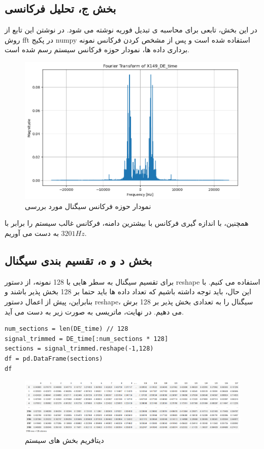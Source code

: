 \subsection{بخش ج، تحلیل فرکانسی}
در این بخش، تابعی برای محاسبه ی تبدیل فوریه نوشته می شود. در نوشتن این تابع از روش fft در پکیج numpy استفاده شده است و پس از مشخص کردن فرکانس نمونه برداری داده ها، نمودار حوزه فرکانس سیستم رسم شده است.


\begin{figure}
	\centering
	\includegraphics[width=1\linewidth]{../img/3}
	\caption{نمودار حوزه فرکانس سیگنال مورد بررسی}
	\label{fig:3_}
\end{figure}
همچنین، با اندازه گیری فرکانس با بیشترین دامنه، فرکانس غالب سیستم را برابر با
$3201 Hz$ به دست می آوریم.

\subsection{بخش د و ه، تقسیم بندی سیگنال}
برای تقسیم سیگنال به سطر هایی با 128 نمونه، از دستور reshape استفاده می کنیم. با این حال، باید توجه داشته باشیم که تعداد داده ها باید حتما بر 128 بخش پذیر باشند و بنابراین، پیش از اعمال دستور reshape، سیگنال را به تعدادی بخش پذیر بر 128 برش می دهیم. 
در نهایت، ماتریسی به صورت زیر به دست می آید.
\begin{verbatim}
num_sections = len(DE_time) // 128
signal_trimmed = DE_time[:num_sections * 128]
sections = signal_trimmed.reshape(-1,128)
df = pd.DataFrame(sections)
df
\end{verbatim}
\begin{figure}
	\centering
	\includegraphics[width=1\linewidth]{../img/4}
	\caption{دیتافریم بخش های سیستم}
	\label{fig:4_}
\end{figure}

